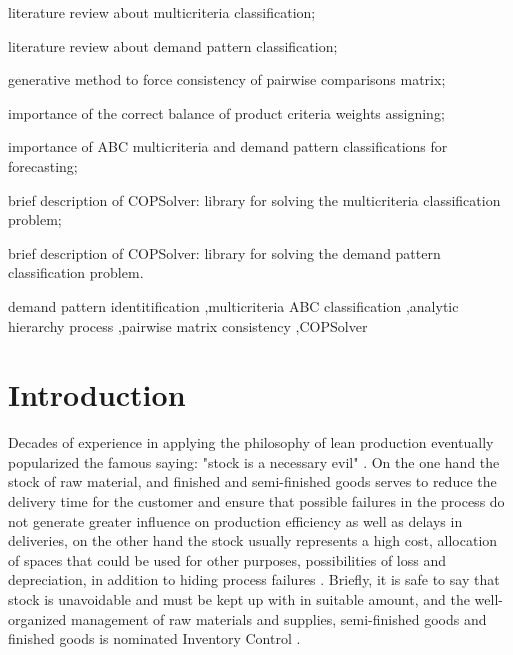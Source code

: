 \documentclass[authoryear,manuscript,12pt]{elsarticle}
\begin{document}
\begin{frontmatter}
\begin{highlights}
\item literature review about multicriteria classification;
\item literature review about demand pattern classification;
\item generative method to force consistency of pairwise comparisons matrix;
\item importance of the correct balance of product criteria weights assigning;
\item importance of ABC multicriteria and demand pattern classifications for forecasting;
\item brief description of COPSolver: library for solving the multicriteria classification problem;
\item brief description of COPSolver: library for solving the demand pattern classification problem.
\end{highlights}

\begin{keyword}
demand pattern identitification \sep multicriteria ABC classification \sep analytic hierarchy process \sep pairwise matrix consistency \sep COPSolver
\end{keyword}
\end{frontmatter}


\section{Introduction}
\label{sec:intro}

Decades of experience in applying the philosophy of lean production eventually popularized the famous saying: "stock is a necessary evil" \citep{Younkin2021}. On the one hand the stock of raw material, and finished and semi-finished goods serves to reduce the delivery time for the customer and ensure that possible failures in the process do not generate greater influence on production efficiency as well as delays in deliveries, on the other hand the stock usually represents a high cost, allocation of spaces that could be used for other purposes, possibilities of loss and depreciation, in addition to hiding process failures \citep{Shingo1996}. Briefly, it is safe to say that stock is unavoidable and must be kept up with in suitable amount, and the well-organized management of raw materials and supplies, semi-finished goods and finished goods is nominated Inventory Control \citep{Nirmala2022}.
\end{document}
